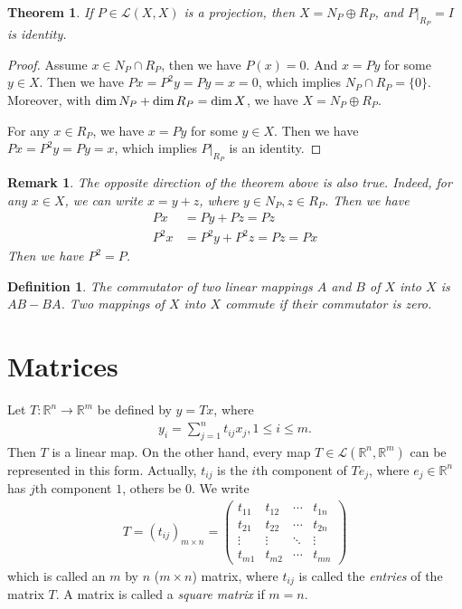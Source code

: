 \documentclass[11pt]{book}
\newtheorem{definition}{Definition}[section]
\newtheorem{theorem}{Theorem}[section]
\newtheorem{remark}{Remark}[section]
\theoremstyle{definition}
\numberwithin{equation}{chapter}
\begin{document}
\begin{theorem}\label{projection_direct_sum}
If $P\in\mathscr{L}(X,X)$ is a projection, then $X = N_P\oplus R_P$, and $P|_{R_P} = I$ is identity.
\end{theorem}
\begin{proof}
Assume $x\in N_P\cap R_P$, then we have $P(x) = 0$. And $x = P y$ for some $y\in X$. Then we have $Px = P^2 y = P y = x = 0$, which implies $N_P\cap R_P = \{0\}$. Moreover, with ${\rm dim}\, N_P + {\rm dim}\, R_P = {\rm dim}\, X$, we have $X = N_P\oplus R_P$.

For any $x\in R_P$, we have $x = P y$ for some $y\in X$. Then we have $Px = P^2 y = Py = x$, which implies $P|_{R_P}$ is an identity.
\end{proof}
\begin{remark}
The opposite direction of the theorem above is also true. Indeed, for any $x\in X$, we can write $x = y+z$, where $y\in N_P, z\in R_P$. Then we have
\begin{align*}
    Px & = Py + Pz = Pz\\
    P^2 x & = P^2 y + P^2 z = Pz = Px
\end{align*}
Then we have $P^2=P$.
\end{remark}

\medskip

\begin{definition}
The commutator of two linear mappings $A$ and $B$ of $X$ into $X$ is $AB - BA$. Two mappings of $X$ into $X$ commute if their commutator is zero.
\end{definition}


\medskip

\chapter{Matrices}
Let $T:\mathbb{R}^n\to\mathbb{R}^m$ be defined by $y = T x$, where
\begin{align*}
    y_i = \sum^n_{j=1} t_{ij}x_j, 1\leq i\leq m.
\end{align*}
Then $T$ is a linear map. On the other hand, every map $T\in \mathscr{L}(\mathbb{R}^n,\mathbb{R}^m)$ can be represented in this form. Actually, $t_{ij}$ is the $i$th component of $Te_j$, where $e_j\in \mathbb{R}^n$ has $j$th component $1$, others be $0$. We write
\begin{align*}
    T = (t_{ij})_{m\times n} = \left(
        \begin{matrix}
        t_{11} & t_{12} & \cdots & t_{1n}\\
        t_{21} & t_{22} & \cdots & t_{2n}\\
        \vdots & \vdots & \ddots & \vdots\\
        t_{m1} & t_{m2} & \cdots & t_{mn}
        \end{matrix}
    \right)
\end{align*}
which is called an $m$ by $n$ ($m\times n$) matrix, where $t_{ij}$ is called the \emph{entries} of the matrix $T$. A matrix is called a \emph{square matrix} if $m=n$. 
\end{document}
